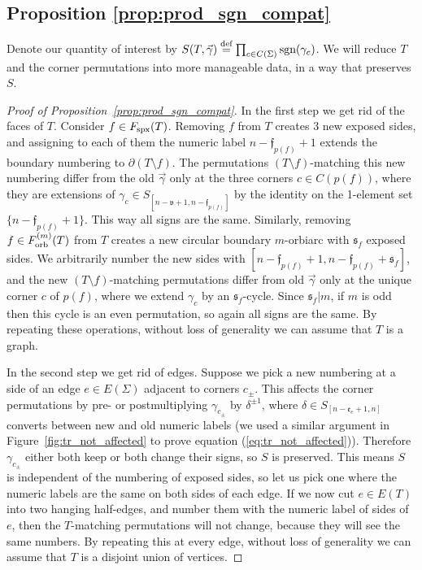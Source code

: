 \documentclass{amsart}
\newcommand{\defeq}{\stackrel{\tn{def}}{=}}
\newcommand{\Fspx}{F_{\textnormal{spx}}}
\newcommand{\Forb}[1][m]{F^{(#1)}_{\textnormal{orb}}}
\newcommand{\tn}{\textnormal}
\begin{document}
\subsection{Proposition \ref{prop:prod_sgn_compat}}\label{ssec:pf_prod_sgn_compat}

Denote our quantity of interest by $S(T,\vec\gamma)\defeq\prod_{c\in C(\Sigma)}\tn{sgn}(\gamma_c)$. We will reduce $T$ and the corner permutations into more manageable data, in a way that preserves $S$.
\begin{proof}[Proof of Proposition~\ref{prop:prod_sgn_compat}]
In the first step we get rid of the faces of $T$. Consider $f\in\Fspx(T)$. Removing $f$ from $T$ creates 3 new exposed sides, and assigning to each of them the numeric label $n-\mathfrak{f}_{p(f)}+1$ extends the boundary numbering to $\partial(T\setminus f)$. The permutations $(T\setminus f)$-matching this new numbering differ from the old $\vec\gamma$ only at the three corners $c\in C(p(f))$, where they are extensions of $\gamma_c\in S_{[n-\mathfrak{v}+1,n-\mathfrak{f}_{p(f)}]}$ by the identity on the 1-element set $\{n-\mathfrak{f}_{p(f)}+1\}$. This way all signs are the same. Similarly, removing $f\in\Forb(T)$ from $T$ creates a new circular boundary $m$-orbiarc with $\mathfrak{s}_f$ exposed sides. We arbitrarily number the new sides with $[n-\mathfrak{f}_{p(f)}+1,n-\mathfrak{f}_{p(f)}+\mathfrak{s}_f]$, and the new $(T\setminus f)$-matching permutations differ from old $\vec\gamma$ only at the unique corner $c$ of $p(f)$, where we extend $\gamma_c$ by an $\mathfrak{s}_f$-cycle. Since $\mathfrak{s}_f|m$, if $m$ is odd then this cycle is an even permutation, so again all signs are the same. By repeating these operations, without loss of generality we can assume that $T$ is a graph.

In the second step we get rid of edges. Suppose we pick a new numbering at a side of an edge $e\in E(\Sigma)$ adjacent to corners $c_\pm$. This affects the corner permutations by pre- or postmultiplying $\gamma_{c_\pm}$ by $\delta^{\pm1}$, where $\delta\in S_{[n-\mathfrak{e}_e+1,n]}$ converts between new and old numeric labels (we used a similar argument in Figure~\ref{fig:tr_not_affected} to prove equation (\ref{eq:tr_not_affected})). Therefore $\gamma_{c_\pm}$ either both keep or both change their signs, so $S$ is preserved. This means $S$ is independent of the numbering of exposed sides, so let us pick one where the numeric labels are the same on both sides of each edge. If we now cut $e\in E(T)$ into two hanging half-edges, and number them with the numeric label of sides of $e$, then the $T$-matching permutations will not change, because they will see the same numbers. By repeating this at every edge, without loss of generality we can assume that $T$ is a disjoint union of vertices.


\end{proof}
\end{document}
